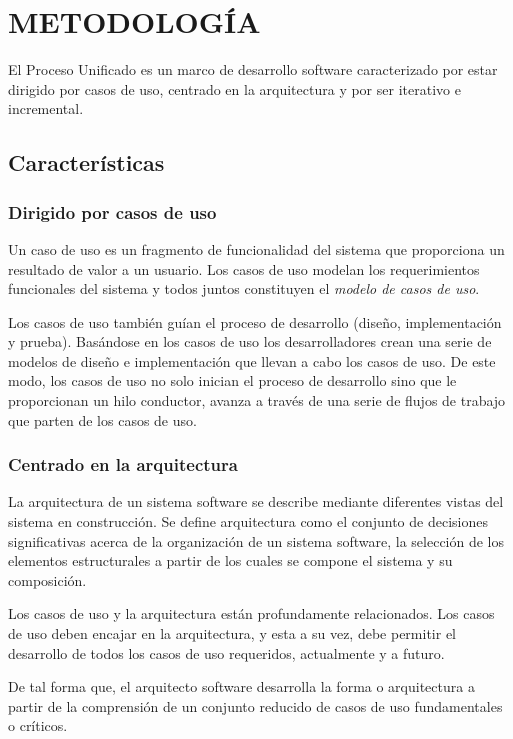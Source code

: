 \chapter[Metodología]{
  \label{chp:metodologia}
  METODOLOGÍA
}
\thispagestyle{numberingStyle}
\pagestyle{numberingStyle}

El Proceso Unificado es un marco de desarrollo software caracterizado por estar dirigido por casos de uso, centrado en la arquitectura y por ser iterativo e incremental.


\section{Características}
\subsection{Dirigido por casos de uso}
Un caso de uso es un fragmento de funcionalidad del sistema que proporciona un resultado de valor a un usuario. Los casos de uso modelan los requerimientos funcionales del sistema y todos juntos constituyen el  \textit{modelo de casos de uso}.

Los casos de uso también guían el proceso de desarrollo (diseño, implementación y prueba). Basándose en los casos de uso los desarrolladores crean una serie de modelos de diseño e implementación que llevan a cabo los casos de uso. De este modo, los casos de uso no solo inician el proceso de desarrollo sino que le proporcionan un hilo conductor, avanza a través de una serie de flujos de trabajo que parten de los casos de uso.

\subsection{Centrado en la arquitectura}
La arquitectura de un sistema software se describe mediante diferentes vistas del sistema en construcción. Se define arquitectura como el conjunto de decisiones significativas acerca de la organización de un sistema software, la selección de los elementos estructurales a partir de los cuales se compone el sistema y su composición.

Los casos de uso y la arquitectura están profundamente relacionados. Los casos de uso deben encajar en la arquitectura, y esta a su vez, debe permitir el desarrollo de todos los casos de uso requeridos, actualmente y a futuro.

De tal forma que, el arquitecto software desarrolla la forma o arquitectura a partir de la comprensión de un conjunto reducido de casos de uso fundamentales o críticos.

